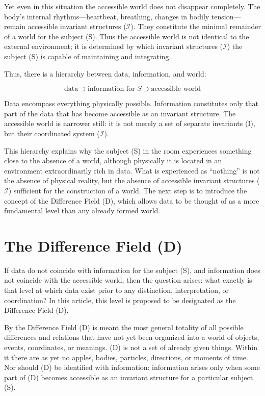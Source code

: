 \documentclass[aps,prd,onecolumn,nofootinbib,superscriptaddress]{revtex4-2} %
\begin{document}
    Yet even in this situation the accessible world does not disappear completely. The body’s internal rhythms—heartbeat, breathing, changes in bodily tension—remain accessible invariant structures ($\mathcal{I}$). They constitute the minimal remainder of a world for the subject (S). Thus the accessible world is not identical to the external environment; it is determined by which invariant structures ($\mathcal{I}$) the subject (S) is capable of maintaining and integrating.

    Thus, there is a hierarchy between data, information, and world:

    \[
        \text{data} \supset \text{information for } S \supset \text{accessible world}
    \]

    Data encompass everything physically possible. Information constitutes only that part of the data that has become accessible as an invariant structure. The accessible world is narrower still: it is not merely a set of separate invariants (I), but their coordinated system ($\mathcal{I}$).

    This hierarchy explains why the subject (S) in the room experiences something close to the absence of a world, although physically it is located in an environment extraordinarily rich in data. What is experienced as “nothing” is not the absence of physical reality, but the absence of accessible invariant structures ($\mathcal{I}$) sufficient for the construction of a world. The next step is to introduce the concept of the Difference Field (D), which allows data to be thought of as a more fundamental level than any already formed world.


    \section{The Difference Field (D)}
    If data do not coincide with information for the subject (S), and information does not coincide with the accessible world, then the question arises: what exactly is that level at which data exist prior to any distinction, interpretation, or coordination? In this article, this level is proposed to be designated as the Difference Field (D).

    By the Difference Field (D) is meant the most general totality of all possible differences and relations that have not yet been organized into a world of objects, events, coordinates, or meanings. (D) is not a set of already given things. Within it there are as yet no apples, bodies, particles, directions, or moments of time. Nor should (D) be identified with information: information arises only when some part of (D) becomes accessible as an invariant structure for a particular subject (S).
\end{document}
